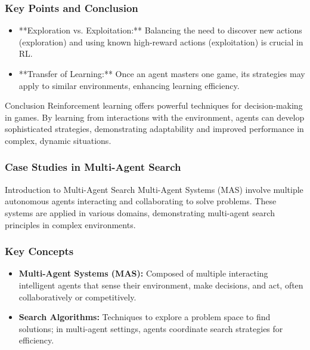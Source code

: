 \documentclass[aspectratio=169]{beamer}
\begin{document}
\begin{frame}[fragile]
    \frametitle{Key Points and Conclusion}
    \begin{itemize}
        \item **Exploration vs. Exploitation:** Balancing the need to discover new actions (exploration) and using known high-reward actions (exploitation) is crucial in RL.
        \item **Transfer of Learning:** Once an agent masters one game, its strategies may apply to similar environments, enhancing learning efficiency.
    \end{itemize}
    \begin{block}{Conclusion}
        Reinforcement learning offers powerful techniques for decision-making in games. By learning from interactions with the environment, agents can develop sophisticated strategies, demonstrating adaptability and improved performance in complex, dynamic situations.
    \end{block}
\end{frame}

\begin{frame}[fragile]
    \frametitle{Case Studies in Multi-Agent Search}
    \begin{block}{Introduction to Multi-Agent Search}
        Multi-Agent Systems (MAS) involve multiple autonomous agents interacting and collaborating to solve problems. These systems are applied in various domains, demonstrating multi-agent search principles in complex environments.
    \end{block}
\end{frame}

\begin{frame}[fragile]
    \frametitle{Key Concepts}
    \begin{itemize}
        \item \textbf{Multi-Agent Systems (MAS):} Composed of multiple interacting intelligent agents that sense their environment, make decisions, and act, often collaboratively or competitively.
        \item \textbf{Search Algorithms:} Techniques to explore a problem space to find solutions; in multi-agent settings, agents coordinate search strategies for efficiency.
    \end{itemize}
\end{frame}
\end{document}
